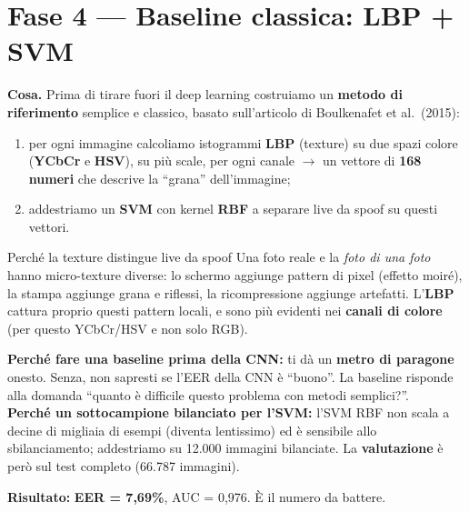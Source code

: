 \documentclass[11pt,a4paper]{article}
\newcommand{\acr}[1]{\textbf{#1}}
\newcommand{\say}[1]{``#1''}
\begin{document}
\section{Fase 4 --- Baseline classica: LBP + SVM}
\textbf{Cosa.} Prima di tirare fuori il deep learning costruiamo un \textbf{metodo di riferimento}
semplice e classico, basato sull'articolo di Boulkenafet et al.\ (2015):
\begin{enumerate}
  \item per ogni immagine calcoliamo istogrammi \acr{LBP} (texture) su due spazi colore
        (\acr{YCbCr} e \acr{HSV}), su pi\`u scale, per ogni canale $\rightarrow$ un vettore di
        \textbf{168 numeri} che descrive la \say{grana} dell'immagine;
  \item addestriamo un \acr{SVM} con kernel \acr{RBF} a separare live da spoof su questi vettori.
\end{enumerate}

\begin{terminebox}{Perch\'e la texture distingue live da spoof}
Una foto reale e la \emph{foto di una foto} hanno micro-texture diverse: lo schermo aggiunge
pattern di pixel (effetto moir\'e), la stampa aggiunge grana e riflessi, la ricompressione
aggiunge artefatti. L'\acr{LBP} cattura proprio questi pattern locali, e sono pi\`u evidenti nei
\textbf{canali di colore} (per questo YCbCr/HSV e non solo RGB).
\end{terminebox}

\begin{perchebox}
\textbf{Perch\'e fare una baseline prima della CNN:} ti d\`a un \textbf{metro di paragone} onesto.
Senza, non sapresti se l'EER della CNN \`e \say{buono}. La baseline risponde alla domanda
\say{quanto \`e difficile questo problema con metodi semplici?}. \\[4pt]
\textbf{Perch\'e un sottocampione bilanciato per l'SVM:} l'SVM RBF non scala a decine di migliaia
di esempi (diventa lentissimo) ed \`e sensibile allo sbilanciamento; addestriamo su 12.000
immagini bilanciate. La \textbf{valutazione} \`e per\`o sul test completo (66.787 immagini).
\end{perchebox}

\textbf{Risultato:} \textbf{EER = 7,69\%}, AUC = 0,976. \`E il numero da battere.

\end{document}

